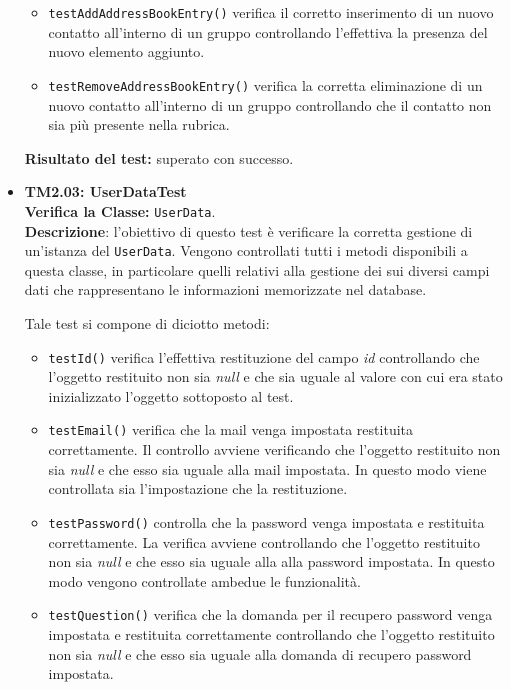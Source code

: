 \begin{itemize}
\begin{itemize}
\item \texttt{testAddAddressBookEntry()} verifica il corretto inserimento di un nuovo contatto all'interno di un gruppo controllando l'effettiva la presenza del nuovo elemento aggiunto.

\item \texttt{testRemoveAddressBookEntry()}  
verifica la corretta eliminazione di un nuovo contatto all'interno di un gruppo controllando che il contatto non sia più presente nella rubrica.

\end{itemize}
\textbf{Risultato del test:} superato con successo.

\item \textbf{TM2.03: UserDataTest}\\
\textbf{Verifica la Classe:} \texttt{UserData}.\\
\textbf{Descrizione}: l'obiettivo di questo test è verificare la corretta gestione di un'istanza del  \texttt{UserData}. Vengono controllati tutti i metodi disponibili a questa classe, in particolare quelli relativi alla gestione dei sui diversi campi dati che rappresentano le informazioni memorizzate nel database.

Tale test si compone di diciotto metodi:
\begin{itemize}

\item \texttt{testId()} verifica l'effettiva restituzione del campo \textit{id} controllando che l'oggetto restituito non sia \textit{null} e che sia uguale al valore con cui era stato inizializzato l'oggetto sottoposto al test.

\item \texttt{testEmail()} verifica che la mail venga impostata restituita correttamente. Il controllo avviene verificando che l'oggetto restituito non sia \textit{null} e che esso sia uguale alla mail impostata. In questo modo viene controllata sia l'impostazione che la restituzione. 

\item \texttt{testPassword()} controlla che la password venga impostata e restituita correttamente. La verifica avviene controllando che l'oggetto restituito non sia \textit{null} e che esso sia uguale alla alla password impostata. In questo modo vengono controllate ambedue le funzionalità.

\item \texttt{testQuestion()} verifica che la domanda per il recupero password venga impostata e restituita correttamente controllando che l'oggetto restituito non sia \textit{null} e che esso sia uguale alla domanda di recupero password impostata.


\end{itemize}
\end{itemize}
